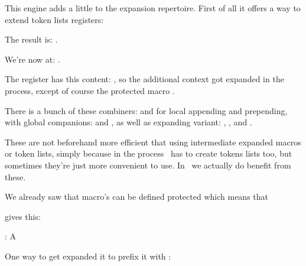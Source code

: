 This engine adds a little to the expansion repertoire. First of all it offers a
way to extend token lists registers:

\startbuffer
\def\MyMacroA{a}
\def\MyMacroB{b}
\normalprotected{}
\scratchtoks{\MyMacroA\MyMacroB}
\stopbuffer

\typebuffer[option=TEX] \getbuffer

The result is: \MyShow.

\startbuffer
\toksapp\scratchtoks{\MyMacroA\MyMacroB}
\stopbuffer

\typebuffer[option=TEX] \getbuffer

We're now at: \MyShow.

\startbuffer
\etoksapp\scratchtoks{\MyMacroA\space\MyMacroB\space\MyMacroC}
\stopbuffer

\typebuffer[option=TEX] \getbuffer

The register has this content: \MyShow, so the additional context got expanded in
the process, except of course the protected macro \type {\MyMacroC}.

There is a bunch of these combiners: \type {\toksapp} and \type {\tokspre} for
local appending and prepending, with global companions: \type {\gtoksapp} and
\type {\gtokspre}, as well as expanding variant: \type {\etoksapp}, \type
{\etokspre}, \type {\xtoksapp} and \type {\xtokspre}.

These are not beforehand more efficient that using intermediate expanded macros
or token lists, simply because in the process \TEX\ has to create tokens lists
too, but sometimes they're just more convenient to use. In \CONTEXT\ we actually
do benefit from these.

\stopsectionlevel

\startsectionlevel[title={\LUAMETATEX\ primitives}]

We already saw that macro's can be defined protected which means that

\startbuffer
           \def\TestA{A}
\protected {}
          \edef\TestC{\TestA\TestB}
\stopbuffer

\typebuffer[option=TEX] \getbuffer

gives this:

\startlines
\type{\TestC} : {\tttf \meaningless\TestC}
\stoplines

One way to get \type {\TestB} expanded it to prefix it with \type {\expand}:

\startbuffer
           \def\TestA{A}
\protected {}
          \edef\TestC{\TestA\TestB}
          \edef\TestD{\TestA\expand\TestB}
\stopbuffer

